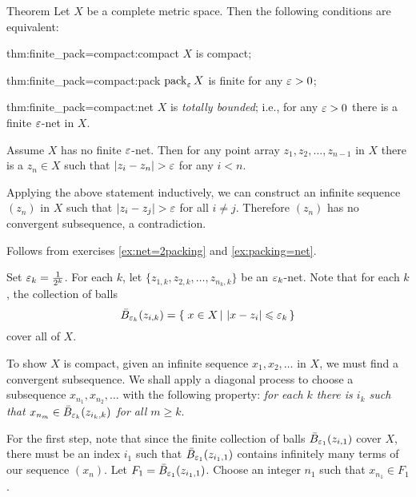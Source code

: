 \begin{thm}{Theorem}\label{thm:finite_pack=compact}
Let $X$ be a complete metric space.
Then the following conditions are equivalent:

\begin{subthm}{thm:finite_pack=compact:compact}
$X$ is compact;
\end{subthm}

\begin{subthm}{thm:finite_pack=compact:pack}
$\operatorname{pack}_\varepsilon X$ is finite for any $\varepsilon>0$;
\end{subthm}

\begin{subthm}{thm:finite_pack=compact:net}
$X$ is \emph{totally bounded};
i.e., for any $\varepsilon>0$ there is a finite $\varepsilon$-net in $X$.
\end{subthm}

\end{thm}

Assume $X$ has no finite $\varepsilon$-net.
Then for any point array $z_1,z_2,\dots,z_{n-1}$ in $X$
there is a $z_n\in X$
such that $|z_i-z_n|>\eps$ for any $i<n$.

Applying the above statement inductively, we can construct an infinite sequence $(z_n)$ in $X$
such that $|z_i-z_j|>\eps$ for all $i\not=j$.
Therefore $(z_n)$ has no convergent subsequence,
a contradiction.

Follows from exercises \ref{ex:net=2packing} and \ref{ex:packing=net}.

Set $\varepsilon_k=\frac1{2^k}$.
For each $k$, 
let $\{z_{1,k},z_{2,k},\dots,z_{n_k,k}\}$ be an $\varepsilon_k$-net.
Note that for each $k$, the collection of balls
$$\bar B_{\eps_k}(z_{i,k})=\set{x\in X}{|x-z_i|\le \eps_k}$$
cover all of $X$.

To show $X$ is compact, given an infinite sequence $x_1,x_2,\dots$ in $X$, we must find a convergent subsequence.
We shall apply a diagonal process to choose a subsequence
$x_{n_1},x_{n_2},\dots$  with the following property:
\textit{for each $k$ there is $i_k$ such that
$x_{n_m}\z\in\bar  B_{\eps_k}(z_{i_k,k})$ for all $m\ge k$}.

For the first step, note that since the finite collection of balls $\bar B_{\varepsilon_1}(z_{i,1})$ cover $X$, there must be an index $i_1$ such that $\bar B_{\varepsilon_1}(z_{i_1,1})$ contains infinitely many terms of our sequence $(x_n)$.  Let $F_1 = \bar B_{\varepsilon_1}(z_{i_1,1})$. Choose an integer $n_1$ such that $x_{n_1} \in F_1$.

